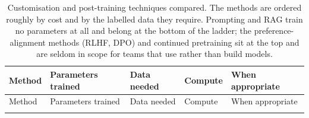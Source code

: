 \documentclass[
  letterpaper,
  11pt]{scrbook}
\begin{document}
\begin{longtable}[]{@{}
  >{\raggedright\arraybackslash}p{}
  >{\raggedright\arraybackslash}p{}
  >{\raggedright\arraybackslash}p{}
  >{\raggedright\arraybackslash}p{}
  >{\raggedright\arraybackslash}p{}@{}}
\caption{Customisation and post-training techniques compared. The
methods are ordered roughly by cost and by the labelled data they
require. Prompting and RAG train no parameters at all and belong at the
bottom of the ladder; the preference-alignment methods (RLHF, DPO) and
continued pretraining sit at the top and are seldom in scope for teams
that use rather than build
models.}\label{tbl-customisation-methods}\tabularnewline
\toprule\noalign{}
\begin{minipage}[b]{\linewidth}\raggedright
Method
\end{minipage} & \begin{minipage}[b]{\linewidth}\raggedright
Parameters trained
\end{minipage} & \begin{minipage}[b]{\linewidth}\raggedright
Data needed
\end{minipage} & \begin{minipage}[b]{\linewidth}\raggedright
Compute
\end{minipage} & \begin{minipage}[b]{\linewidth}\raggedright
When appropriate
\end{minipage} \\
\midrule\noalign{}
\endfirsthead
\toprule\noalign{}
\begin{minipage}[b]{\linewidth}\raggedright
Method
\end{minipage} & \begin{minipage}[b]{\linewidth}\raggedright
Parameters trained
\end{minipage} & \begin{minipage}[b]{\linewidth}\raggedright
Data needed
\end{minipage} & \begin{minipage}[b]{\linewidth}\raggedright
Compute
\end{minipage} & \begin{minipage}[b]{\linewidth}\raggedright
When appropriate
\end{minipage} \\
\midrule\noalign{}
\endhead

\end{longtable}
\end{document}

